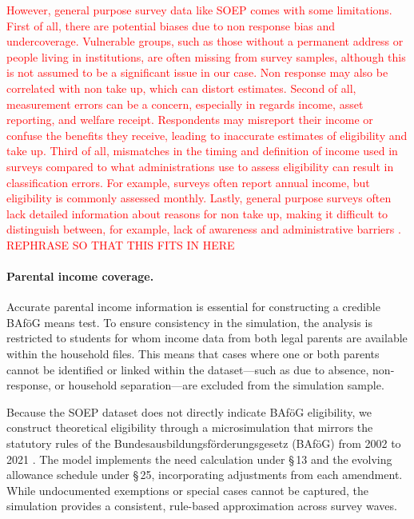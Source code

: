 \textcolor{red}{However, general purpose survey data like SOEP comes with some limitations. First of all, there are potential biases due to non response bias and undercoverage. Vulnerable groups, such as those without a permanent address or people living in institutions, are often missing from survey samples, although this is not assumed to be a significant issue in our case. Non response may also be correlated with non take up, which can distort estimates. Second of all, measurement errors can be a concern, especially in regards income, asset reporting, and welfare receipt. Respondents may misreport their income or confuse the benefits they receive, leading to inaccurate estimates of eligibility and take up. Third of all, mismatches in the timing and definition of income used in surveys compared to what administrations use to assess eligibility can result in classification errors. For example, surveys often report annual income, but eligibility is commonly assessed monthly. Lastly, general purpose surveys often lack detailed information about reasons for non take up, making it difficult to distinguish between, for example, lack of awareness and administrative barriers \citep{mechelen_who_2017}. REPHRASE SO THAT THIS FITS IN HERE}

\paragraph{Parental income coverage.} %
Accurate parental income information is essential for constructing a credible BAföG means test. 
To ensure consistency in the simulation, the analysis is restricted to students for whom income data from both legal parents are available within the household files. 
This means that cases where one or both parents cannot be identified or linked within the dataset—such as due to absence, non-response, or household separation—are excluded from the simulation sample.

Because the SOEP dataset does not directly indicate BAföG eligibility, we construct theoretical eligibility through a microsimulation that mirrors the statutory rules of the Bundesausbildungsförderungsgesetz (BAföG) from 2002 to 2021 \citep{bafoeg_law,bafoeg20,bafoeg21,bafoeg22,bafoeg23,bafoeg24,bafoeg25,bafoeg26,bafoeg27,bafoeg28,bafoeg29}. 
The model implements the need calculation under §\,13 and the evolving allowance schedule under §\,25, incorporating adjustments from each amendment. 
While undocumented exemptions or special cases cannot be captured, the simulation provides a consistent, rule-based approximation across survey waves.

